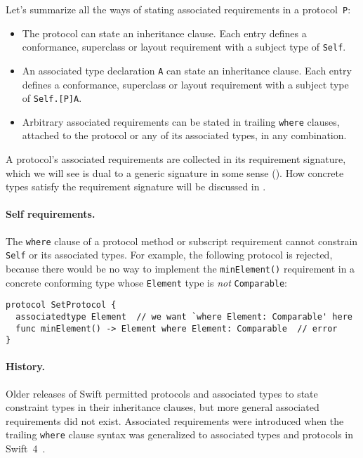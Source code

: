 \documentclass[../generics]{subfiles}
\begin{document}
Let's summarize all the ways of stating associated requirements in a protocol~\texttt{P}:
\begin{itemize}
\item The protocol can state an inheritance clause. Each entry defines a conformance, superclass or layout requirement with a subject type of \texttt{Self}.
\item An associated type declaration \texttt{A} can state an inheritance clause. Each entry defines a conformance, superclass or layout requirement with a subject type of \texttt{Self.[P]A}.
\item Arbitrary associated requirements can be stated in trailing \texttt{where} clauses, attached to the protocol or any of its associated types, in any combination.
\end{itemize}

A protocol's associated requirements are collected in its requirement signature, which we will see is dual to a generic signature in some sense (). How concrete types satisfy the requirement signature will be discussed in .

\paragraph{Self requirements.}
The \texttt{where} clause of a protocol method or subscript requirement cannot constrain \texttt{Self} or its associated types. For example, the following protocol is rejected, because there would be no way to implement the \texttt{minElement()} requirement in a concrete conforming type whose \texttt{Element} type is \emph{not} \texttt{Comparable}:
\begin{Verbatim}
protocol SetProtocol {
  associatedtype Element  // we want `where Element: Comparable' here
  func minElement() -> Element where Element: Comparable  // error
}
\end{Verbatim}

\paragraph{History.}
Older releases of Swift permitted protocols and associated types to state constraint types in their inheritance clauses, but more general associated requirements did not exist. Associated requirements were introduced when the trailing \texttt{where} clause syntax was generalized to associated types and protocols in Swift~4~\cite{se0142}.
\end{document}
